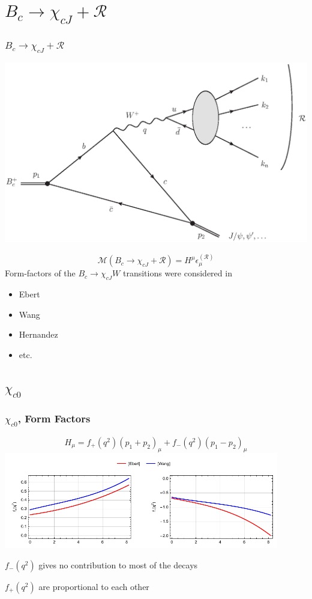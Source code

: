 \documentclass{beamer}
\newcommand{\R}{\mathcal{R}}
\newcommand{\M}{\mathcal{M}}
\begin{document}
\section{$B_c\to \chi_{cJ}+\R$}
\begin{frame}
  \frametitle{$B_c\to \chi_{cJ}+\R$}
\begin{center}
  \includegraphics[width=0.5\columnwidth]{diags_BcCCW}
\end{center}
$$\M\left(B_c \to \chi_{cJ} + \R\right) = H^\mu \epsilon^{(\R)}_\mu$$
Form-factors of the $B_c\to \chi_{cJ}W$ transitions were considered in
\begin{itemize}
\item Ebert
\item Wang
\item Hernandez
\item etc.
\end{itemize}
\end{frame}

\subsection{$\chi_{c0}$}
\begin{frame}
  \frametitle{$\chi_{c0}$, Form Factors}
  $$
  H_\mu = f_{+}\left(q^2\right) \left(p_1+p_2\right)_\mu + f_{-}\left(q^2\right) \left(p_1-p_2\right)_\mu 
  $$
  \includegraphics[width=0.9\textwidth]{figs/ff_chi_c0}

  $f_{-}(q^2)$ gives no contribution to most of the decays
  
  $f_{+}(q^2)$ are proportional to each other
\end{frame}

\newcommand{\Br}{\mathrm{Br}}
\end{document}
